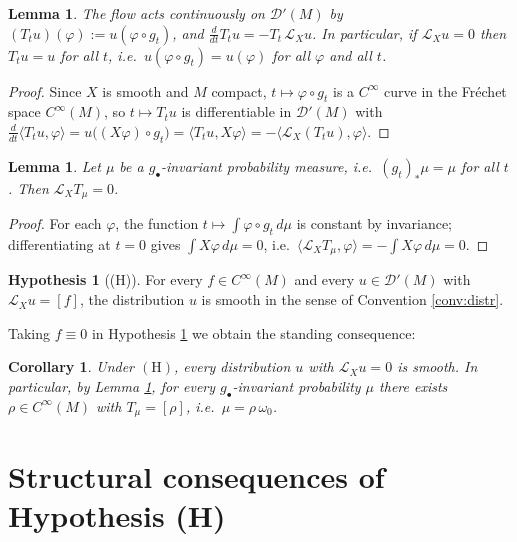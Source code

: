 \documentclass[11pt]{amsart}
\theoremstyle{plain}
\newtheorem{lemma}[theorem]{Lemma}
\newtheorem{corollary}[theorem]{Corollary}
\theoremstyle{definition}
\newtheorem{hypothesis}[theorem]{Hypothesis}
\theoremstyle{remark}
\newcommand{\Dp}{\mathcal{D}'}
\newcommand{\Lx}{\mathcal{L}_X}
\begin{document}
\begin{lemma}\label{lem:flowaction}
The flow acts continuously on $\Dp(M)$ by
$(T_tu)(\varphi):=u(\varphi\circ g_t)$, and
$\frac{d}{dt}T_tu=-T_t\,\Lx u$. In particular, if $\Lx u=0$ then
$T_tu=u$ for all $t$, i.e.\ $u(\varphi\circ g_t)=u(\varphi)$ for all
$\varphi$ and all $t$.
\end{lemma}

\begin{proof}
Since $X$ is smooth and $M$ compact, $t\mapsto \varphi\circ g_t$ is a
$C^\infty$ curve in the Fr\'echet space $C^\infty(M)$, so $t\mapsto T_tu$
is differentiable in $\Dp(M)$ with
$\frac d{dt}\langle T_tu,\varphi\rangle
=u\bigl((X\varphi)\circ g_t\bigr)=\langle T_tu,X\varphi\rangle
=-\langle \Lx (T_tu),\varphi\rangle$.
\end{proof}

\begin{lemma}\label{lem:invmeasure}
Let $\mu$ be a $g_\bullet$-invariant probability measure, i.e.\
$(g_t)_*\mu=\mu$ for all $t$. Then $\Lx T_\mu=0$.
\end{lemma}

\begin{proof}
For each $\varphi$, the function $t\mapsto\int\varphi\circ g_t\,d\mu$
is constant by invariance; differentiating at $t=0$ gives
$\int X\varphi\,d\mu=0$, i.e.\
$\langle \Lx T_\mu,\varphi\rangle=-\int X\varphi\,d\mu=0$.
\end{proof}

\begin{hypothesis}[(H)]\label{hyp:H}
For every $f\in C^\infty(M)$ and every $u\in\Dp(M)$ with
$\Lx u=[f]$, the distribution $u$ is smooth in the sense of Convention
\ref{conv:distr}.
\end{hypothesis}

Taking $f\equiv 0$ in Hypothesis \ref{hyp:H} we obtain the standing
consequence:

\begin{corollary}\label{cor:invdist}
Under $(\mathrm{H})$, every distribution $u$ with $\Lx u=0$ is smooth. In
particular, by Lemma \ref{lem:invmeasure}, for every $g_\bullet$-invariant
probability $\mu$ there exists $\rho\in C^\infty(M)$ with
$T_\mu=[\rho]$, i.e.\ $\mu=\rho\,\omega_0$.
\end{corollary}

\section{Structural consequences of Hypothesis (H)}\label{sec:structure}
\end{document}

